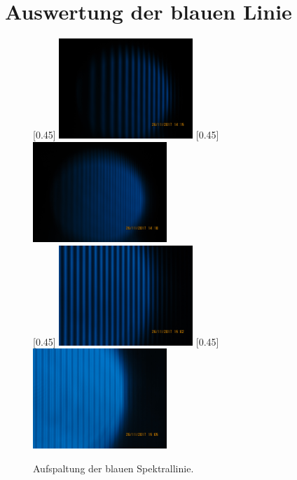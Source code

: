\section{Auswertung der blauen Linie}
\begin{figure}[h!]
  \centering
  [0.45\textwidth]{
  \centering
  \includegraphics[width=0.45\textwidth]{Bilder/B00A.jpg}
  }
  [0.45\textwidth]{
  \centering
  \includegraphics[width=0.45\textwidth]{Bilder/B055A.jpg}
  }\\
  [0.45\textwidth]{
  \centering
  \includegraphics[width=0.45\textwidth]{Bilder/Bneu00A.jpg}
  }
  [0.45\textwidth]{
  \centering
  \includegraphics[width=0.45\textwidth]{Bilder/Bneu90r14A.jpg}
  }
  \caption{Aufspaltung der blauen Spektrallinie.}
  \label{A_Abb:3}
\end{figure}
